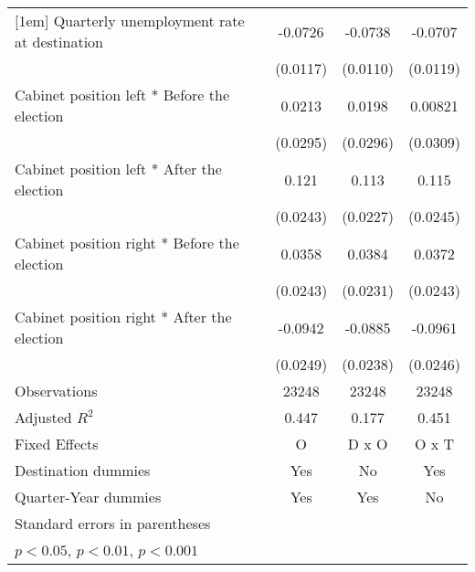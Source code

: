 \begin{table}[htbp]
\begin{tabular}{l*{3}{c}}
[1em]
Quarterly unemployment rate at destination&     -0.0726\sym{***}&     -0.0738\sym{***}&     -0.0707\sym{***}\\
                    &    (0.0117)         &    (0.0110)         &    (0.0119)         \\
[1em]
Cabinet position left * Before the election&      0.0213         &      0.0198         &     0.00821         \\
                    &    (0.0295)         &    (0.0296)         &    (0.0309)         \\
[1em]
Cabinet position left * After the election&       0.121\sym{***}&       0.113\sym{***}&       0.115\sym{***}\\
                    &    (0.0243)         &    (0.0227)         &    (0.0245)         \\
[1em]
Cabinet position right * Before the election&      0.0358         &      0.0384         &      0.0372         \\
                    &    (0.0243)         &    (0.0231)         &    (0.0243)         \\
[1em]
Cabinet position right * After the election&     -0.0942\sym{***}&     -0.0885\sym{***}&     -0.0961\sym{***}\\
                    &    (0.0249)         &    (0.0238)         &    (0.0246)         \\
\hline
Observations        &       23248         &       23248         &       23248         \\
Adjusted \(R^{2}\)  &       0.447         &       0.177         &       0.451         \\
Fixed Effects       &           O         &       D x O         &       O x T         \\
Destination dummies &         Yes         &          No         &         Yes         \\
Quarter-Year dummies&         Yes         &         Yes         &          No         \\
\hline\hline
\multicolumn{4}{l}{\footnotesize Standard errors in parentheses}\\
\multicolumn{4}{l}{\footnotesize \sym{*} \(p<0.05\), \sym{**} \(p<0.01\), \sym{***} \(p<0.001\)}\\
\end{tabular}
\end{table}
